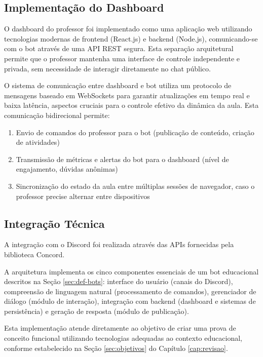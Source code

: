 \subsection{Implementação do Dashboard}

O dashboard do professor foi implementado como uma aplicação web utilizando tecnologias modernas de frontend (React.js) e backend (Node.js), comunicando-se com o bot através de uma API REST segura. Esta separação arquitetural permite que o professor mantenha uma interface de controle independente e privada, sem necessidade de interagir diretamente no chat público.

O sistema de comunicação entre dashboard e bot utiliza um protocolo de mensagens baseado em WebSockets para garantir atualizações em tempo real e baixa latência, aspectos cruciais para o controle efetivo da dinâmica da aula. Esta comunicação bidirecional permite:

\begin{enumerate}
\item Envio de comandos do professor para o bot (publicação de conteúdo, criação de atividades)
\item Transmissão de métricas e alertas do bot para o dashboard (nível de engajamento, dúvidas anônimas)
\item Sincronização do estado da aula entre múltiplas sessões de navegador, caso o professor precise alternar entre dispositivos
\end{enumerate}

\subsection{Integração Técnica}

A integração com o Discord foi realizada através das APIs fornecidas pela biblioteca Concord.

A arquitetura implementa os cinco componentes essenciais de um bot educacional descritos na Seção \ref{sec:def-bots}: interface do usuário (canais do Discord), compreensão de linguagem natural (processamento de comandos), gerenciador de diálogo (módulo de interação), integração com backend (dashboard e sistemas de persistência) e geração de resposta (módulo de publicação).

Esta implementação atende diretamente ao objetivo de criar uma prova de conceito funcional utilizando tecnologias adequadas ao contexto educacional, conforme estabelecido na Seção \ref{sec:objetivos} do Capítulo \ref{cap:revisao}.

